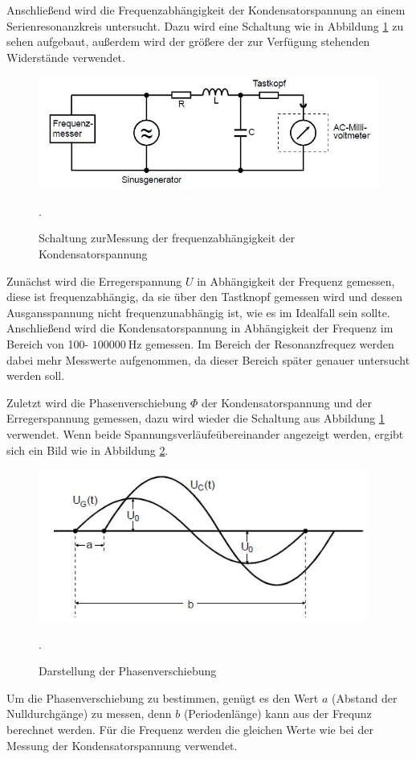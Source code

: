 Anschließend wird die Frequenzabhängigkeit der Kondensatorspannung an einem
Serienresonanzkreis untersucht. Dazu wird eine Schaltung wie in Abbildung
\ref{fig:c} zu sehen aufgebaut, außerdem wird der größere der zur Verfügung
stehenden Widerstände verwendet.
\begin{figure}[H]
  \centering
  \includegraphics[width=13cm]{c.JPG}
  \caption{Schaltung zurMessung der frequenzabhängigkeit der Kondensatorspannung}
  \cite{skript}.
  \label{fig:c}
\end{figure}
Zunächst wird die Erregerspannung $U$ in Abhängigkeit der Frequenz gemessen, diese
ist frequenzabhängig, da sie über den Tastknopf gemessen wird und dessen
Ausgansspannung nicht frequenzunabhängig ist, wie es im Idealfall sein sollte.
Anschließend wird die Kondensatorspannung in Abhängigkeit der Frequenz im Bereich
von 100\;- $\SI{100000}{\Hz}$ gemessen. Im Bereich der Resonanzfrequez werden
dabei mehr Messwerte aufgenommen, da dieser Bereich später genauer untersucht werden soll.

Zuletzt wird die Phasenverschiebung $\Phi$ der Kondensatorspannung und
der Erregerspannung gemessen, dazu wird wieder die Schaltung aus Abbildung \ref{fig:c}
verwendet. Wenn beide Spannungsverläufeübereinander angezeigt werden, ergibt sich ein Bild
wie in Abbildung \ref{fig:phase}.
\begin{figure}[H]
  \centering
  \includegraphics[height=5cm]{phase.JPG}
  \caption{Darstellung der Phasenverschiebung}
  \cite{skript2}.
  \label{fig:phase}
\end{figure}
Um die Phasenverschiebung zu bestimmen, genügt es den Wert $a$ (Abstand der Nulldurchgänge) zu messen, denn
$b$ (Periodenlänge) kann aus der Frequnz berechnet werden. Für die Frequenz werden die gleichen
Werte wie bei der Messung der Kondensatorspannung verwendet.





\label{sec:Durchführung}
